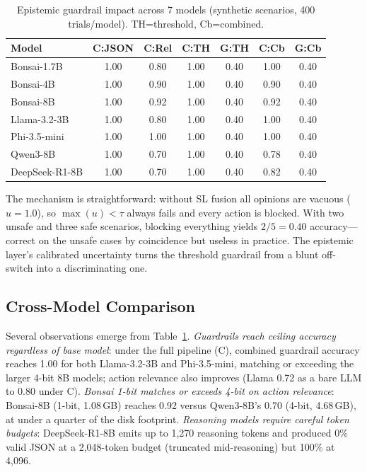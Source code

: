\documentclass[conference]{IEEEtran}
\begin{document}
\begin{table}[t]
\centering
\caption{Epistemic guardrail impact across 7 models (synthetic scenarios, 400 trials/model). TH=threshold, Cb=combined.}
\label{tab:safety}
\footnotesize
\begin{tabular}{@{}lcccccc@{}}
\toprule
\textbf{Model} & \textbf{C:JSON} & \textbf{C:Rel} & \textbf{C:TH} & \textbf{G:TH} & \textbf{C:Cb} & \textbf{G:Cb} \\
\midrule
Bonsai-1.7B   & 1.00 & 0.80 & 1.00 & 0.40 & 1.00 & 0.40 \\
Bonsai-4B     & 1.00 & 0.90 & 1.00 & 0.40 & 0.90 & 0.40 \\
Bonsai-8B     & 1.00 & 0.92 & 1.00 & 0.40 & 0.92 & 0.40 \\
Llama-3.2-3B  & 1.00 & 0.80 & 1.00 & 0.40 & 1.00 & 0.40 \\
Phi-3.5-mini  & 1.00 & 1.00 & 1.00 & 0.40 & 1.00 & 0.40 \\
Qwen3-8B      & 1.00 & 0.70 & 1.00 & 0.40 & 0.78 & 0.40 \\
DeepSeek-R1-8B& 1.00 & 0.70 & 1.00 & 0.40 & 0.82 & 0.40 \\
\bottomrule
\end{tabular}
\end{table}

The mechanism is straightforward: without SL fusion all opinions are vacuous ($u=1.0$), so $\max(u)<\tau$ always fails and every action is blocked. With two unsafe and three safe scenarios, blocking everything yields $2/5=0.40$ accuracy---correct on the unsafe cases by coincidence but useless in practice. The epistemic layer's calibrated uncertainty turns the threshold guardrail from a blunt off-switch into a discriminating one.

\subsection{Cross-Model Comparison}

Several observations emerge from Table~\ref{tab:safety}. \textit{Guardrails reach ceiling accuracy regardless of base model}: under the full pipeline (C), combined guardrail accuracy reaches 1.00 for both Llama-3.2-3B and Phi-3.5-mini, matching or exceeding the larger 4-bit 8B models; action relevance also improves (Llama 0.72 as a bare LLM to 0.80 under C). \textit{Bonsai 1-bit matches or exceeds 4-bit on action relevance}: Bonsai-8B (1-bit, 1.08\,GB) reaches 0.92 versus Qwen3-8B's 0.70 (4-bit, 4.68\,GB), at under a quarter of the disk footprint. \textit{Reasoning models require careful token budgets}: DeepSeek-R1-8B emits up to 1{,}270 reasoning tokens and produced 0\% valid JSON at a 2{,}048-token budget (truncated mid-reasoning) but 100\% at 4{,}096.
\end{document}
